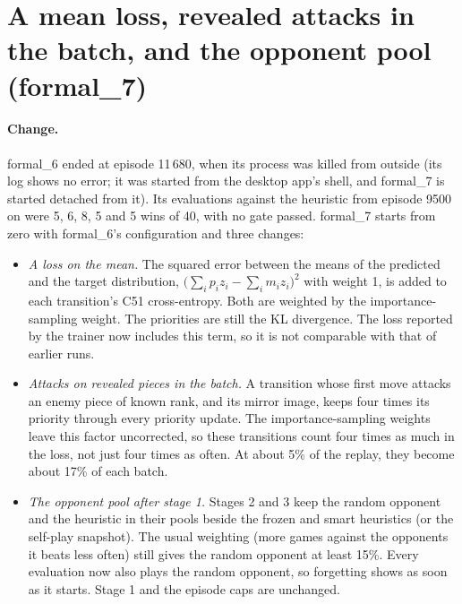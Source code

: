 \section{A mean loss, revealed attacks in the batch, and the opponent pool (formal\_7)}
\label{sec:formal7}

\paragraph{Change.} formal\_6 ended at episode 11\,680, when its process was killed from outside
(its log shows no error; it was started from the desktop app's shell, and formal\_7 is started
detached from it). Its evaluations against the heuristic from episode 9500 on were 5, 6, 8, 5 and
5 wins of 40, with no gate passed. formal\_7
starts from zero with formal\_6's configuration and three changes:
\begin{itemize}
  \item \emph{A loss on the mean.} The squared error between the means of the predicted and the
        target distribution, $\bigl(\sum_i p_i z_i - \sum_i m_i z_i\bigr)^2$ with weight 1, is
        added to each transition's C51 cross-entropy. Both are weighted by the importance-sampling
        weight. The priorities are still the KL divergence. The loss reported by the trainer now
        includes this term, so it is not comparable with that of earlier runs.
  \item \emph{Attacks on revealed pieces in the batch.} A transition whose first move attacks an
        enemy piece of known rank, and its mirror image, keeps four times its priority through
        every priority update. The importance-sampling weights leave this factor uncorrected, so
        these transitions count four times as much in the loss, not just four times as often.
        At about 5\% of the replay, they become about 17\% of each batch.
  \item \emph{The opponent pool after stage 1.} Stages 2 and 3 keep the random opponent and the
        heuristic in their pools beside the frozen and smart heuristics (or the self-play
        snapshot). The usual weighting (more games against the opponents it beats less often)
        still gives the random opponent at least 15\%. Every evaluation now also plays the random
        opponent, so forgetting shows as soon as it starts. Stage 1 and the episode caps are
        unchanged.
\end{itemize}

